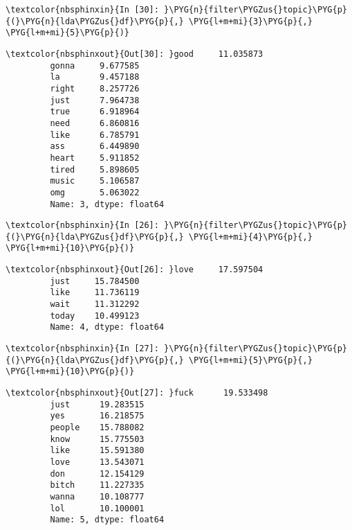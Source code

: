 \documentclass[letterpaper,10pt,english]{sphinxmanual}
\begin{document}
%
\begin{Verbatim}[commandchars=\\\{\}]
\textcolor{nbsphinxin}{In [30]: }\PYG{n}{filter\PYGZus{}topic}\PYG{p}{(}\PYG{n}{lda\PYGZus{}df}\PYG{p}{,} \PYG{l+m+mi}{3}\PYG{p}{,} \PYG{l+m+mi}{5}\PYG{p}{)}
\end{Verbatim}

%
\begin{Verbatim}[commandchars=\\\{\}]
\textcolor{nbsphinxout}{Out[30]: }good     11.035873
         gonna     9.677585
         la        9.457188
         right     8.257726
         just      7.964738
         true      6.918964
         need      6.860816
         like      6.785791
         ass       6.449890
         heart     5.911852
         tired     5.898605
         music     5.106587
         omg       5.063022
         Name: 3, dtype: float64
\end{Verbatim}

%
\begin{Verbatim}[commandchars=\\\{\}]
\textcolor{nbsphinxin}{In [26]: }\PYG{n}{filter\PYGZus{}topic}\PYG{p}{(}\PYG{n}{lda\PYGZus{}df}\PYG{p}{,} \PYG{l+m+mi}{4}\PYG{p}{,} \PYG{l+m+mi}{10}\PYG{p}{)}
\end{Verbatim}

%
\begin{Verbatim}[commandchars=\\\{\}]
\textcolor{nbsphinxout}{Out[26]: }love     17.597504
         just     15.784500
         like     11.736119
         wait     11.312292
         today    10.499123
         Name: 4, dtype: float64
\end{Verbatim}

%
\begin{Verbatim}[commandchars=\\\{\}]
\textcolor{nbsphinxin}{In [27]: }\PYG{n}{filter\PYGZus{}topic}\PYG{p}{(}\PYG{n}{lda\PYGZus{}df}\PYG{p}{,} \PYG{l+m+mi}{5}\PYG{p}{,} \PYG{l+m+mi}{10}\PYG{p}{)}
\end{Verbatim}

%
\begin{Verbatim}[commandchars=\\\{\}]
\textcolor{nbsphinxout}{Out[27]: }fuck      19.533498
         just      19.283515
         yes       16.218575
         people    15.788082
         know      15.775503
         like      15.591380
         love      13.543071
         don       12.154129
         bitch     11.227335
         wanna     10.108777
         lol       10.100001
         Name: 5, dtype: float64
\end{Verbatim}
\end{document}
